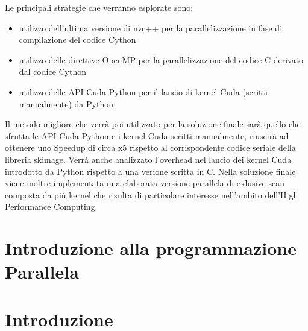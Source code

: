 \documentclass[12pt,a4paper]{report}
\begin{document}
Le principali strategie che verranno esplorate sono:
\begin{itemize}
\item utilizzo dell'ultima versione di nvc++ per la parallelizzazione in fase di compilazione del codice Cython
\item utilizzo delle direttive OpenMP per la parallelizzazione del codice C derivato dal codice Cython
\item utilizzo delle API Cuda-Python per il lancio di kernel Cuda (scritti manualmente) da Python 
\end{itemize}
Il metodo migliore che verrà poi utilizzato per la soluzione finale sarà quello che sfrutta le API Cuda-Python e i kernel Cuda scritti manualmente, riuscirà ad ottenere uno Speedup di circa x5 rispetto al corrispondente codice seriale della libreria skimage. Verrà anche analizzato l'overhead nel lancio dei kernel Cuda introdotto da Python rispetto a una verione scritta in C. \newline
Nella soluzione finale viene inoltre implementata una elaborata versione parallela di exlusive scan composta da più kernel che risulta di particolare interesse nell'ambito dell'High Performance Computing.

\chapter{Introduzione alla programmazione Parallela}

\chapter{Introduzione}
\end{document}
